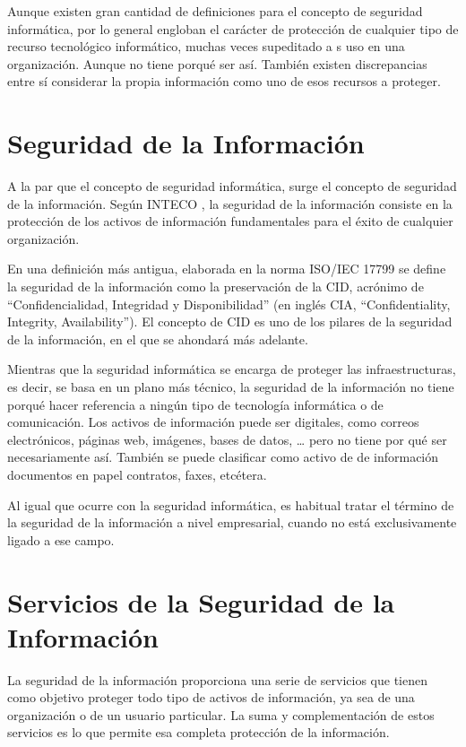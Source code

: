 Aunque existen gran cantidad de definiciones para el concepto de seguridad informática, por lo general engloban el carácter de protección de cualquier tipo de recurso tecnológico informático, muchas veces supeditado a s uso en una organización. Aunque no tiene porqué ser así. También existen discrepancias entre sí considerar la propia información como uno de esos recursos a proteger. 


\section{Seguridad de la Información}

A la par que el concepto de seguridad informática, surge el concepto de seguridad de la información. Según INTECO \cite{inteco-defs}, la seguridad de la información consiste en la protección de los activos de información fundamentales para el éxito de cualquier organización.

En una definición más antigua, elaborada en la norma ISO/IEC 17799 \cite{iso-17799} se define la seguridad de la información como la preservación de la CID, acrónimo de “Confidencialidad, Integridad y Disponibilidad” (en inglés CIA, “Confidentiality, Integrity, Availability”). El concepto de CID es uno de los pilares de la seguridad de la información, en el que se ahondará más adelante.

Mientras que la seguridad informática se encarga de proteger las infraestructuras, es decir, se basa en un plano más técnico, la seguridad de la información no tiene porqué hacer referencia a ningún tipo de tecnología informática o de comunicación. Los activos de información puede ser digitales, como correos electrónicos, páginas web, imágenes, bases de datos, …  pero no  tiene por qué ser necesariamente así. También se puede clasificar como activo de  de información documentos en papel contratos, faxes, etcétera.

Al igual que ocurre con la seguridad informática, es habitual tratar el término de la seguridad de la información a nivel empresarial, cuando no está exclusivamente ligado a ese campo.


\section{Servicios de la Seguridad de la Información}
La seguridad de la información proporciona una serie de servicios que tienen como objetivo proteger todo tipo de activos de información, ya sea de una organización o de un usuario particular. La suma y complementación de estos servicios es lo que permite esa completa protección de la información.

